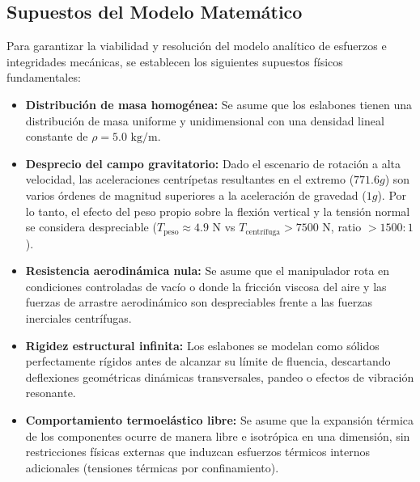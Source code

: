 \documentclass[11pt,a4paper]{article}
\begin{document}
\subsection{Supuestos del Modelo Matemático}
Para garantizar la viabilidad y resolución del modelo analítico de esfuerzos e integridades mecánicas, se establecen los siguientes supuestos físicos fundamentales:
\begin{itemize}
    \item \textbf{Distribución de masa homogénea:} Se asume que los eslabones tienen una distribución de masa uniforme y unidimensional con una densidad lineal constante de $\rho = 5.0\text{ kg/m}$.
    \item \textbf{Desprecio del campo gravitatorio:} Dado el escenario de rotación a alta velocidad, las aceleraciones centrípetas resultantes en el extremo ($771.6g$) son varios órdenes de magnitud superiores a la aceleración de gravedad ($1g$). Por lo tanto, el efecto del peso propio sobre la flexión vertical y la tensión normal se considera despreciable ($T_{\text{peso}} \approx 4.9\text{ N}$ vs $T_{\text{centrífuga}} > 7500\text{ N}$, ratio $>1500:1$).
    \item \textbf{Resistencia aerodinámica nula:} Se asume que el manipulador rota en condiciones controladas de vacío o donde la fricción viscosa del aire y las fuerzas de arrastre aerodinámico son despreciables frente a las fuerzas inerciales centrífugas.
    \item \textbf{Rigidez estructural infinita:} Los eslabones se modelan como sólidos perfectamente rígidos antes de alcanzar su límite de fluencia, descartando deflexiones geométricas dinámicas transversales, pandeo o efectos de vibración resonante.
    \item \textbf{Comportamiento termoelástico libre:} Se asume que la expansión térmica de los componentes ocurre de manera libre e isotrópica en una dimensión, sin restricciones físicas externas que induzcan esfuerzos térmicos internos adicionales (tensiones térmicas por confinamiento).
\end{itemize}

\end{document}
